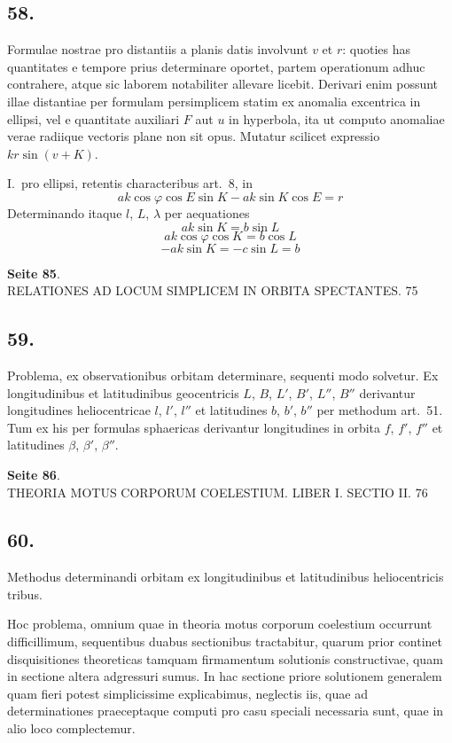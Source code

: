 \documentclass[12pt,a4paper]{article}
\begin{document}
\subsection*{58.}

Formulae nostrae pro distantiis a planis datis involvunt $v$ et $r$: quoties has quantitates e tempore prius determinare oportet, partem operationum adhuc contrahere, atque sic laborem notabiliter allevare licebit. Derivari enim possunt illae distantiae per formulam persimplicem statim ex anomalia excentrica in ellipsi, vel e quantitate auxiliari $F$ aut $u$ in hyperbola, ita ut computo anomaliae verae radiique vectoris plane non sit opus. Mutatur scilicet expressio $kr \sin(v + K)$.

I.~pro ellipsi, retentis characteribus art.~8, in
\[
ak \cos \varphi \cos E \sin K - ak \sin K \cos E = r
\]
Determinando itaque $l$, $L$, $\lambda$ per aequationes
\[
ak \sin K = b \sin L
\]
\[
ak \cos \varphi \cos K = b \cos L
\]
\[
-ak \sin K = -c \sin L = b
\]

\textbf{Seite 85}.\\
RELATIONES AD LOCUM SIMPLICEM IN ORBITA SPECTANTES. 75

\subsection*{59.}

Problema, ex observationibus orbitam determinare, sequenti modo solvetur. Ex longitudinibus et latitudinibus geocentricis $L$, $B$, $L'$, $B'$, $L''$, $B''$ derivantur longitudines heliocentricae $l$, $l'$, $l''$ et latitudines $b$, $b'$, $b''$ per methodum art.~51. Tum ex his per formulas sphaericas derivantur longitudines in orbita $f$, $f'$, $f''$ et latitudines $\beta$, $\beta'$, $\beta''$.

\textbf{Seite 86}.\\
THEORIA MOTUS CORPORUM COELESTIUM. LIBER I. SECTIO II. 76

\subsection*{60.}

Methodus determinandi orbitam ex longitudinibus et latitudinibus heliocentricis tribus.

Hoc problema, omnium quae in theoria motus corporum coelestium occurrunt difficillimum, sequentibus duabus sectionibus tractabitur, quarum prior continet disquisitiones theoreticas tamquam firmamentum solutionis constructivae, quam in sectione altera adgressuri sumus. In hac sectione priore solutionem generalem quam fieri potest simplicissime explicabimus, neglectis iis, quae ad determinationes praeceptaque computi pro casu speciali necessaria sunt, quae in alio loco complectemur.
\end{document}
